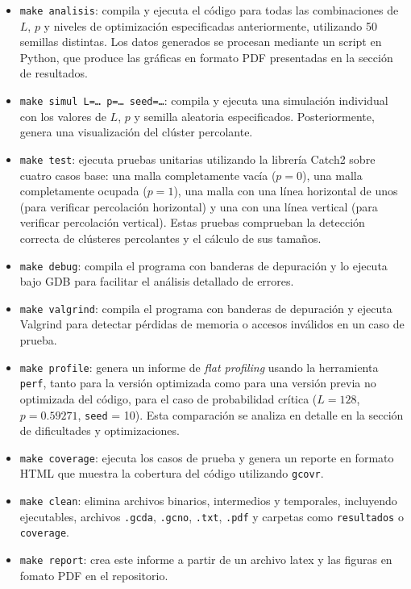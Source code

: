 \documentclass[%
 reprint,
 amsmath,amssymb,
 aps,
]{revtex4-2}
\begin{document}
\begin{itemize}
    \item \texttt{make analisis}: compila y ejecuta el código para todas las combinaciones de \( L \), \( p \) y niveles de optimización especificadas anteriormente, utilizando 50 semillas distintas. Los datos generados se procesan mediante un script en Python, que produce las gráficas en formato PDF presentadas en la sección de resultados.

    \item \texttt{make simul L=\dots\ p=\dots\ seed=\dots}: compila y ejecuta una simulación individual con los valores de \( L \), \( p \) y semilla aleatoria especificados. Posteriormente, genera una visualización del clúster percolante.
    
    \item \texttt{make test}: ejecuta pruebas unitarias utilizando la librería Catch2 sobre cuatro casos base: una malla completamente vacía (\( p = 0 \)), una malla completamente ocupada (\( p = 1 \)), una malla con una línea horizontal de unos (para verificar percolación horizontal) y una con una línea vertical (para verificar percolación vertical). Estas pruebas comprueban la detección correcta de clústeres percolantes y el cálculo de sus tamaños.
    
    \item \texttt{make debug}: compila el programa con banderas de depuración y lo ejecuta bajo GDB para facilitar el análisis detallado de errores.
    
    \item \texttt{make valgrind}: compila el programa con banderas de depuración y ejecuta Valgrind para detectar pérdidas de memoria o accesos inválidos en un caso de prueba.
    
    \item \texttt{make profile}: genera un informe de \textit{flat profiling} usando la herramienta \texttt{perf}, tanto para la versión optimizada como para una versión previa no optimizada del código, para el caso de probabilidad crítica (\( L = 128 \), \( p = 0.59271 \), \texttt{seed} = 10). Esta comparación se analiza en detalle en la sección de dificultades y optimizaciones.
    
    \item \texttt{make coverage}: ejecuta los casos de prueba y genera un reporte en formato HTML que muestra la cobertura del código utilizando \texttt{gcovr}.
    
    \item \texttt{make clean}: elimina archivos binarios, intermedios y temporales, incluyendo ejecutables, archivos \texttt{.gcda}, \texttt{.gcno}, \texttt{.txt}, \texttt{.pdf} y carpetas como \texttt{resultados} o \texttt{coverage}.

    \item \texttt{make report}: crea este informe a partir de un archivo latex y las figuras en fomato PDF en el repositorio.
    
\end{itemize}
\end{document}
